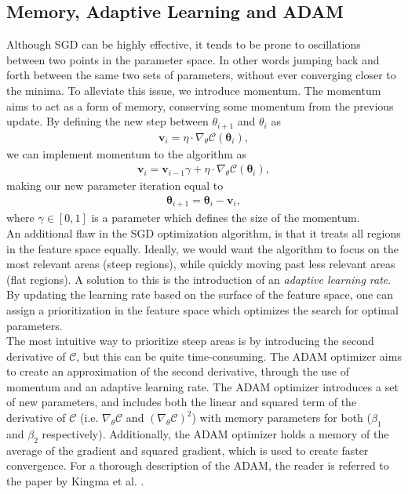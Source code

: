 \subsection{Memory, Adaptive Learning and ADAM}\label{subsec:ADAM}
Although \ac{SGD} can be highly effective, it tends to be prone to oscillations between two points in the parameter space. In other words jumping back and forth between 
the same two sets of parameters, without ever converging closer to the minima. To alleviate this issue, we introduce momentum. The momentum aims to act as a form of 
memory, conserving some momentum from the previous update. By defining the new step between $\theta_{i+1}$ and $\theta_{i}$ as 
\begin{align}
    \textbf{v}_i = \eta \cdot \nabla_\theta \mathcal{C}\left(\boldsymbol{\theta}_i\right),
\end{align}
we can implement momentum to the algorithm as 
\begin{align}
    \textbf{v}_i = \textbf{v}_{i-1} \gamma +\eta \cdot \nabla_\theta \mathcal{C}\left(\boldsymbol{\theta}_i\right),
\end{align}
making our new parameter iteration equal to
\begin{align}
    \boldsymbol{\theta}_{i+1}=\boldsymbol{\theta}_i-\textbf{v}_i,
\end{align}
where $\gamma \in [0,1]$ is a parameter which defines the size of the momentum.
\\
An additional flaw in the \ac{SGD} optimization algorithm, is that it treats all regions in the feature space equally. Ideally, we would want the algorithm to focus 
on the most relevant areas (steep regions), while quickly moving past less relevant areas (flat regions). A solution to this is the introduction of an \emph{adaptive learning rate}.
By updating the learning rate based on the surface of the feature space, one can assign a prioritization in the feature space which optimizes the search for optimal parameters.
\\
The most intuitive way to prioritize steep areas is by introducing the second derivative of $\mathcal{C}$, but this can be quite time-consuming. The \ac{ADAM} optimizer aims to 
create an approximation of the second derivative, through the use of momentum and an adaptive learning rate. The \ac{ADAM} optimizer introduces a set of new parameters, and includes both the 
linear and squared term of the derivative of $\mathcal{C}$ (i.e. $\nabla_\theta \mathcal{C}$ and $(\nabla_\theta \mathcal{C})^2$) with memory parameters for both ($\beta_1$ and $\beta_2$ respectively). Additionally, the \ac{ADAM} optimizer holds a memory of the average of the 
gradient and squared gradient, which is used to create faster convergence. For a thorough description of the \ac{ADAM}, the reader is referred to the paper by Kingma et al.  \cite{kingma_adam_2017}.
